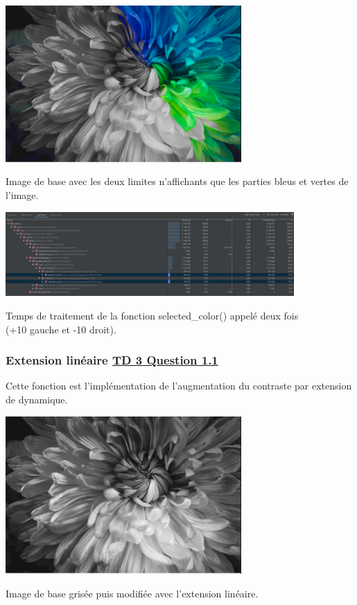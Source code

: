 \documentclass{article}
\begin{document}
\begin{center} 
    \includegraphics[width=9cm]{../Image_fonctions/SelectedColor}

    Image de base avec les deux limites n'affichants que les parties bleus et vertes de l'image.
\end{center}
\bigbreak

\begin{center} 
    \includegraphics[width=11cm]{../Image_temps/TempsSelectedColor}

    Temps de traitement de la fonction selected\_color() appelé deux fois\\(+10 gauche et -10 droit).
\end{center}
\bigbreak

\subsubsection{Extension linéaire \underline{TD 3 Question 1.1}}
Cette fonction est l'implémentation de l'augmentation du contraste par extension de dynamique.
\bigbreak

\begin{center} 
    \includegraphics[width=9cm]{../Image_fonctions/ExtensionLineaire}

    Image de base grisée puis modifiée avec l'extension linéaire.
\end{center}
\bigbreak
\end{document}
